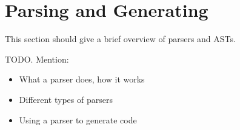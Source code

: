 \section{Parsing and Generating} %
\label{sec:parsing_and_generating}
This section should give a brief overview of parsers and ASTs.

TODO. Mention:
\begin{itemize}
	\item What a parser does, how it works
	\item Different types of parsers
	\item Using a parser to generate code
\end{itemize}

